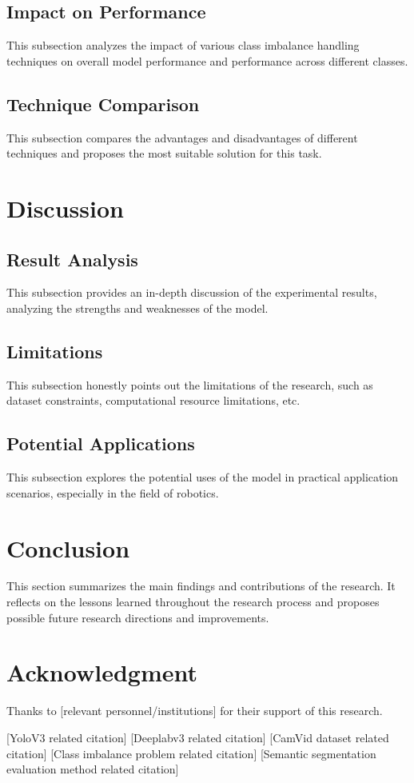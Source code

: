 \documentclass[conference]{IEEEtran}
\begin{document}
\subsection{Impact on Performance}
This subsection analyzes the impact of various class imbalance handling techniques on overall model performance and performance across different classes.

\subsection{Technique Comparison}
This subsection compares the advantages and disadvantages of different techniques and proposes the most suitable solution for this task.

\section{Discussion}
\subsection{Result Analysis}
This subsection provides an in-depth discussion of the experimental results, analyzing the strengths and weaknesses of the model.

\subsection{Limitations}
This subsection honestly points out the limitations of the research, such as dataset constraints, computational resource limitations, etc.

\subsection{Potential Applications}
This subsection explores the potential uses of the model in practical application scenarios, especially in the field of robotics.

\section{Conclusion}
This section summarizes the main findings and contributions of the research. It reflects on the lessons learned throughout the research process and proposes possible future research directions and improvements.

\section*{Acknowledgment}
Thanks to [relevant personnel/institutions] for their support of this research.

\begin{thebibliography}{00}
 [YoloV3 related citation]
 [Deeplabv3 related citation]
 [CamVid dataset related citation]
 [Class imbalance problem related citation]
 [Semantic segmentation evaluation method related citation]
\end{thebibliography}
\end{document}

